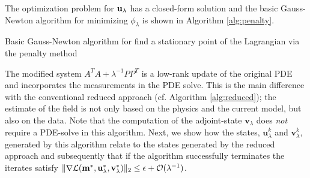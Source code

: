 \documentclass{iopart}
\begin{document}
The optimization problem for $\mathbf{u}_{\lambda}$ has a closed-form solution and 
the basic Gauss-Newton algorithm for minimizing $\phi_{\lambda}$ is shown in Algorithm \ref{alg:penalty}. 


\begin{algorithm}
\caption{Basic Gauss-Newton algorithm for find a stationary point of the Lagrangian via the penalty method}
\label{alg:penalty}
\begin{algorithmic}


\ENDWHILE
\end{algorithmic}
\end{algorithm}

The modified system $A^TA + \lambda^{-1}PP^T$ is a low-rank update of the original PDE and
incorporates the measurements in the PDE solve. This is the main difference with the conventional reduced approach (cf. Algorithm \ref{alg:reduced}); 
the estimate of the field is not only based on the physics and the current model, but also on the data.
Note that the computation of the adjoint-state $\mathbf{v}_{\lambda}$ does \emph{not} require a PDE-solve
in this algorithm.
Next, we show how the states, $\mathbf{u}^k_{\lambda}$ and $\mathbf{v}^k_{\lambda}$, generated by this algorithm  
relate to the states generated by the reduced approach and subsequently that if the algorithm successfully terminates
the iterates satisfy $\|\nabla\mathcal{L}(\mathbf{m}^*, \mathbf{u}^*_{\lambda}, \mathbf{v}^*_{\lambda})\|_2 \leq \epsilon + \mathcal{O}(\lambda^{-1})$.
\end{document}
